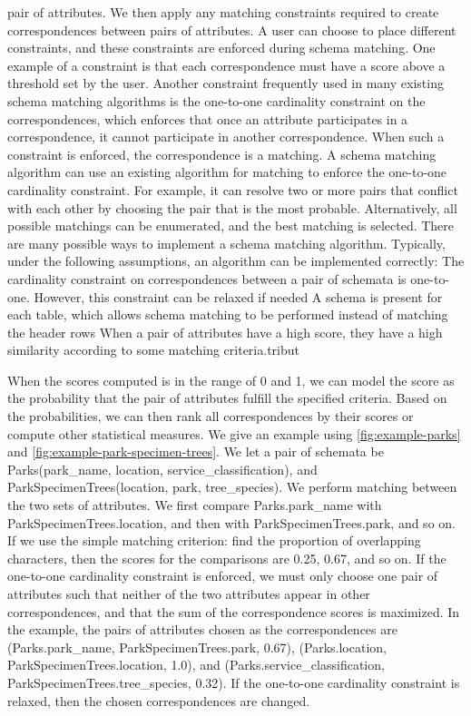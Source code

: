 pair of attributes. We then apply any matching constraints required to create correspondences between pairs of attributes. A user can choose to place different constraints, and these constraints are enforced during schema matching. One example of a constraint is that each correspondence must have a score above a threshold set by the user.
Another constraint frequently used in many existing schema matching algorithms is the one-to-one cardinality constraint on the correspondences, which enforces that once an attribute participates in a correspondence, it cannot participate in another correspondence. When such a constraint is enforced, the correspondence is a matching. A schema matching algorithm can use an existing algorithm for matching to enforce the one-to-one cardinality constraint. For example, it can resolve two or more pairs that conflict with each other by choosing the pair that is the most probable. Alternatively, all possible matchings can be enumerated, and the best matching is selected.
There are many possible ways to implement a schema matching algorithm. Typically, under the following assumptions, an algorithm can be implemented correctly:
 The cardinality constraint on correspondences between a pair of schemata is one-to-one. However, this constraint can be relaxed if needed
 A schema is present for each table, which allows schema matching to be performed instead of matching the header rows
 When a pair of attributes have a high score, they have a high similarity according to some matching criteria.tribut

When the scores computed is in the range of 0 and 1, we can model the score as the probability that the pair of attributes fulfill the specified criteria. Based on the probabilities, we can then rank all correspondences by their scores or compute other statistical measures.
We give an example using \autoref{fig:example-parks} and \autoref{fig:example-park-specimen-trees}. We let a pair of schemata be
Parks(park\_name, location, service\_classification), and
ParkSpecimenTrees(location, park, tree\_species).
We perform matching between the two sets of attributes. We first compare Parks.park\_name with ParkSpecimenTrees.location, and then with ParkSpecimenTrees.park, and so on. If we use the simple matching criterion: find the proportion of overlapping characters, then the scores for the comparisons are 0.25, 0.67, and so on. If the one-to-one cardinality constraint is enforced, we must only choose one pair of attributes such that neither of the two attributes appear in other correspondences, and that the sum of the correspondence scores is maximized. In the example, the pairs of attributes chosen as the correspondences are
(Parks.park\_name, ParkSpecimenTrees.park, 0.67),
(Parks.location, ParkSpecimenTrees.location, 1.0), and
(Parks.service\_classification, ParkSpecimenTrees.tree\_species, 0.32).
If the one-to-one cardinality constraint is relaxed, then the chosen correspondences are changed.

